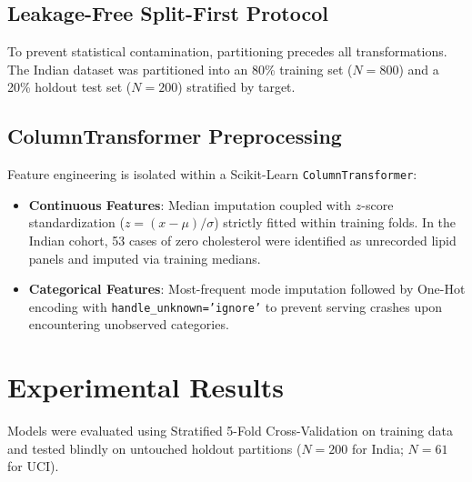\documentclass[journal]{IEEEtran}
\begin{document}
\subsection{Leakage-Free Split-First Protocol}
To prevent statistical contamination, partitioning precedes all transformations. The Indian dataset was partitioned into an 80\% training set ($N=800$) and a 20\% holdout test set ($N=200$) stratified by target. 

\subsection{ColumnTransformer Preprocessing}
Feature engineering is isolated within a Scikit-Learn \texttt{ColumnTransformer}:
\begin{itemize}
    \item \textbf{Continuous Features}: Median imputation coupled with $z$-score standardization ($z = (x-\mu)/\sigma$) strictly fitted within training folds. In the Indian cohort, 53 cases of zero cholesterol were identified as unrecorded lipid panels and imputed via training medians.
    \item \textbf{Categorical Features}: Most-frequent mode imputation followed by One-Hot encoding with \texttt{handle\_unknown='ignore'} to prevent serving crashes upon encountering unobserved categories.
\end{itemize}

\section{Experimental Results}
Models were evaluated using Stratified 5-Fold Cross-Validation on training data and tested blindly on untouched holdout partitions ($N=200$ for India; $N=61$ for UCI).
\end{document}
